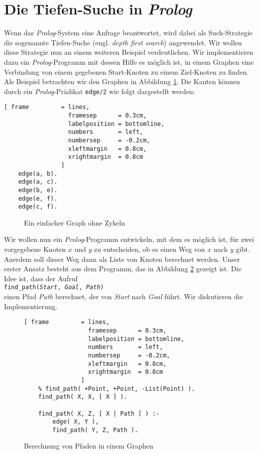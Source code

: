 \section{Die Tiefen-Suche in \textsl{Prolog}}
Wenn das \textsl{Prolog}-System eine Anfrage beantwortet, wird dabei als Such-Strategie
die sogenannte Tiefen-Suche (engl. \emph{depth first search}) angewendet.  Wir wollen
diese Strategie nun an einem weiteren Beispiel verdeutlichen.  Wir implementieren dazu ein
\textsl{Prolog}-Programm  
mit dessen Hilfe es m\"{o}glich ist, in einem Graphen eine Verbindung von einem gegebenen
Start-Knoten zu einem Ziel-Knoten zu finden.  Als Beispiel betrachten wir den Graphen in
Abbildung \ref{fig:graph}.  Die Kanten k\"{o}nnen durch ein \textsl{Prolog}-Pr\"{a}dikat \texttt{edge/2}
wie folgt dargestellt werden:

\begin{Verbatim}[ frame         = lines, 
                  framesep      = 0.3cm, 
                  labelposition = bottomline,
                  numbers       = left,
                  numbersep     = -0.2cm,
                  xleftmargin   = 0.8cm,
                  xrightmargin  = 0.8cm
                ]
    edge(a, b).
    edge(a, c).
    edge(b, e).
    edge(e, f).
    edge(c, f).
\end{Verbatim}

\begin{figure}[!h]
  \centering
  \caption{Ein einfacher Graph ohne Zykeln}
  \label{fig:graph}
\end{figure}

Wir wollen nun ein \textsl{Prolog}-Programm entwickeln, mit dem es m\"{o}glich ist, f\"{u}r zwei
vorgegebene Knoten $x$ und $y$ zu entscheiden, ob es einen Weg von $x$ nach $y$ gibt.
Au\3erdem soll dieser Weg dann als Liste von Knoten berechnet werden.
Unser erster Ansatz besteht aus dem Programm, das in Abbildung \ref{fig:connect} gezeigt
ist.  Die Idee ist, dass der Aufruf \\[0.1cm]
\hspace*{1.3cm} \texttt{find\_path(\textsl{Start}, \textsl{Goal}, \textsl{Path})} \\[0.1cm]
einen Pfad \textsl{Path} berechnet, der von \textsl{Start} nach \textsl{Goal} f\"{u}hrt.  Wir diskutieren
die Implementierung.

\begin{figure}[!h]
  \centering
\begin{Verbatim}[ frame         = lines, 
                  framesep      = 0.3cm, 
                  labelposition = bottomline,
                  numbers       = left,
                  numbersep     = -0.2cm,
                  xleftmargin   = 0.8cm,
                  xrightmargin  = 0.8cm
                ]
    % find_path( +Point, +Point, -List(Point) ).
    find_path( X, X, [ X ] ).
    
    find_path( X, Z, [ X | Path ] ) :-
        edge( X, Y ),
        find_path( Y, Z, Path ).
\end{Verbatim}
\vspace*{-0.3cm}
  \caption{Berechnung von Pfaden in einem Graphen}
  \label{fig:connect}
\end{figure}

